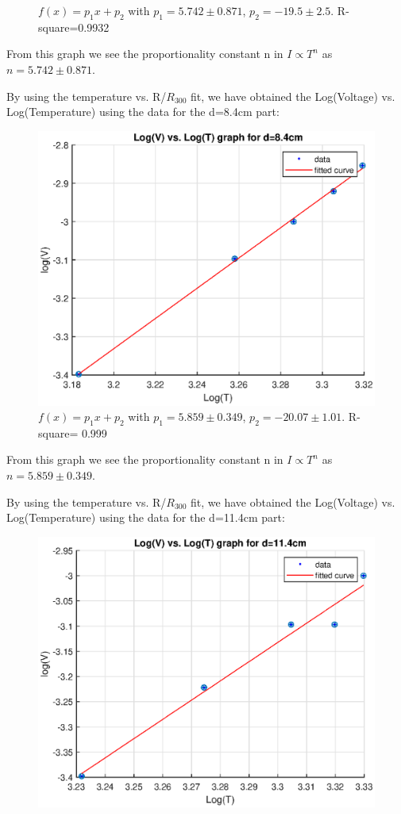 \documentclass[10pt,a4paper]{article}
\begin{document}
{\begin{figure}[H]
\caption{$f(x) = p_1x+p_2$ with $p_1=5.742\pm0.871$, $p_2=-19.5\pm2.5$. R-square=0.9932}
\end{figure}
\par From this graph we see the proportionality constant n in $I\propto T^n$ as $n=5.742\pm0.871$. 
\par By using the temperature vs. R/$R_{300}$ fit, we have obtained the Log(Voltage) vs. Log(Temperature) using the data for the d=8.4cm part:
\begin{figure}[H]
\advance{}
\includegraphics[scale=0.7]{d2high.eps}
\caption{$f(x) = p_1x+p_2$ with $p_1=5.859 \pm0.349$, $p_2=-20.07\pm1.01$. R-square= 0.999}
\end{figure}
\par From this graph we see the proportionality constant n in $I\propto T^n$ as $n=5.859 \pm0.349$.
\par By using the temperature vs. R/$R_{300}$ fit, we have obtained the Log(Voltage) vs. Log(Temperature) using the data for the d=11.4cm part:
\begin{figure}[H]
\advance{}
\includegraphics[scale=0.7]{d3high.eps}

\end{figure}}
\end{document}
